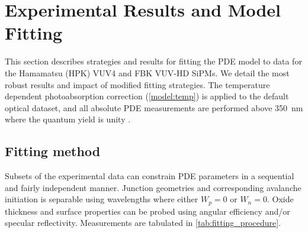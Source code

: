 \section{Experimental Results and Model Fitting}
\label{sec:fitting_the_model}


This section describes strategies and results for fitting the PDE model to data for the Hamamatsu (HPK) VUV4 and FBK VUV-HD SiPMs. We detail the most robust results and impact of modified fitting strategies. The temperature dependent photoabsorption correction (\autoref{model:temp}) is applied to the default optical dataset, and all absolute PDE measurements are performed above 350~nm where the quantum yield is unity \cite{Lewis_2025_qy}.

\subsection{Fitting method}
\label{sec:fit_sequential}
Subsets of the experimental data can constrain PDE parameters in a sequential and fairly independent manner. Junction geometries and corresponding avalanche initiation is separable using wavelengths where either $W_p=0$ or $W_n=0$. Oxide thickness and surface properties can be probed using angular efficiency and/or specular reflectivity. Measurements are tabulated in \autoref{tab:fitting_procedure}.

